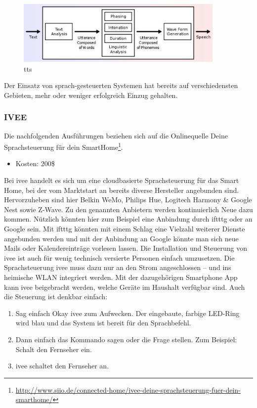 \begin{figure}[h!]
	\centering
	\includegraphics[width=0.9\textwidth]{img/Feedback-Mechanismen/TTS.png}
	\caption{\gls{tts}}
	\label{fig:feedbackTTS}
\end{figure}

Der Einsatz von sprach-gesteuerten Systemen hat bereits auf verschiedensten Gebieten, mehr oder weniger erfolgreich Einzug gehalten.

\subsubsection{IVEE}
Die nachfolgenden Ausführungen beziehen sich auf die Onlinequelle \glqq Deine Sprachsteuerung für dein SmartHome\grqq\footnote{\url{http://www.siio.de/connected-home/ivee-deine-sprachsteuerung-fuer-dein-smarthome/}}.

\begin{itemize}
\item Kosten: 200\$
\end{itemize}

\noindent
Bei ivee handelt es sich um eine cloudbasierte Sprachsteuerung für das Smart Home, bei der vom Marktstart an bereits diverse Hersteller angebunden sind. Hervorzuheben sind hier Belkin WeMo, Philips Hue, Logitech Harmony \& Google Nest sowie Z-Wave. Zu den genannten Anbietern werden kontinuierlich Neue dazu kommen. Nützlich könnten hier zum Beispiel eine Anbindung durch \gls{iftttg} oder an Google sein. Mit \gls{iftttg} könnten mit einem Schlag eine Vielzahl weiterer Dienste angebunden werden und mit der Anbindung an Google könnte man sich neue Mails oder Kalendereinträge vorlesen lassen. Die Installation und Steuerung von ivee ist auch für wenig technisch versierte Personen einfach umzusetzen. Die Sprachsteuerung ivee muss dazu nur an den Strom angeschlossen – und ins heimische WLAN integriert werden. Mit der dazugehörigen Smartphone App kann ivee beigebracht werden, welche Geräte im Haushalt verfügbar sind. Auch die Steuerung ist denkbar einfach:

\begin{enumerate}
\item Sag einfach \glqq Okay ivee\grqq{} zum Aufwecken. Der eingebaute, farbige LED-Ring wird blau und das System ist bereit für den Sprachbefehl.
\item Dann einfach das Kommando sagen oder die Frage stellen. Zum Beispiel: \glqq Schalt den Fernseher ein\grqq .
\item ivee schaltet den Fernseher an.\\
\end{enumerate}

